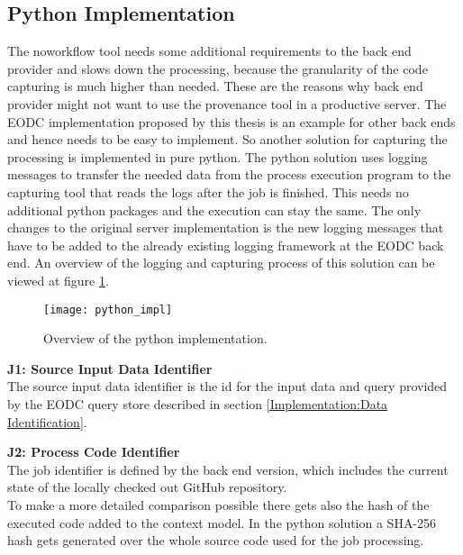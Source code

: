 \documentclass[draft,final]{vutinfth} %
\begin{document}
\subsection{Python Implementation}\label{Implementation:Python Implementation}
The noworkflow tool needs some additional requirements to the back end provider and slows down the processing, because the granularity of the code capturing is much higher than needed. These are the reasons why back end provider might not want to use the provenance tool in a productive server. The EODC implementation proposed by this thesis is an example for other back ends and hence needs to be easy to implement. So another solution for capturing the processing is implemented in pure python. 
The python solution uses logging messages to transfer the needed data from the process execution program to the capturing tool that reads the logs after the job is finished. This needs no additional python packages and the execution can stay the same. The only changes to the original server implementation is the new logging messages that have to be added to the already existing logging framework at the EODC back end. An overview of the logging and capturing process of this solution can be viewed at figure \ref{fig:python_impl}. 

\begin{figure}[h]
	\centering
	\texttt{[image: python\_impl]}
	\caption{Overview of the python implementation.}
	\label{fig:python_impl} %
\end{figure}

\textbf{J1:  Source Input Data Identifier} \\
The source input data identifier is the id for the input data and query provided by the EODC query store described in section \ref{Implementation:Data Identification}. 

\textbf{J2: Process Code Identifier} \\
The job identifier is defined by the back end version, which includes the current state of the locally checked out GitHub repository.\\
To make a more detailed comparison possible there gets also the hash of the executed code added to the context model. In the python solution a SHA-256 hash gets generated over the whole source code used for the job processing. 
\end{document}
